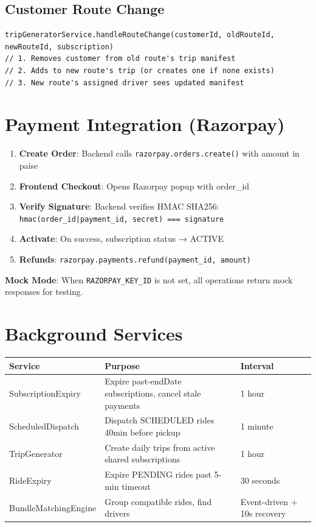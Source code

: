 \documentclass[11pt,a4paper]{article}
\begin{document}
\subsection{Customer Route Change}
\begin{lstlisting}
tripGeneratorService.handleRouteChange(customerId, oldRouteId, newRouteId, subscription)
// 1. Removes customer from old route's trip manifest
// 2. Adds to new route's trip (or creates one if none exists)
// 3. New route's assigned driver sees updated manifest
\end{lstlisting}

\section{Payment Integration (Razorpay)}

\begin{enumerate}
  \item \textbf{Create Order}: Backend calls \texttt{razorpay.orders.create()} with amount in paise
  \item \textbf{Frontend Checkout}: Opens Razorpay popup with order\_id
  \item \textbf{Verify Signature}: Backend verifies HMAC SHA256: \\
    \texttt{hmac(order\_id|payment\_id, secret) === signature}
  \item \textbf{Activate}: On success, subscription status → ACTIVE
  \item \textbf{Refunds}: \texttt{razorpay.payments.refund(payment\_id, amount)}
\end{enumerate}

\textbf{Mock Mode}: When \texttt{RAZORPAY\_KEY\_ID} is not set, all operations return mock responses for testing.

\section{Background Services}

\begin{longtable}{lp{5cm}l}
\toprule
\textbf{Service} & \textbf{Purpose} & \textbf{Interval} \\
\midrule
SubscriptionExpiry & Expire past-endDate subscriptions, cancel stale payments & 1 hour \\
ScheduledDispatch & Dispatch SCHEDULED rides 40min before pickup & 1 minute \\
TripGenerator & Create daily trips from active shared subscriptions & 1 hour \\
RideExpiry & Expire PENDING rides past 5-min timeout & 30 seconds \\
BundleMatchingEngine & Group compatible rides, find drivers & Event-driven + 10s recovery \\
\bottomrule
\end{longtable}
\end{document}
